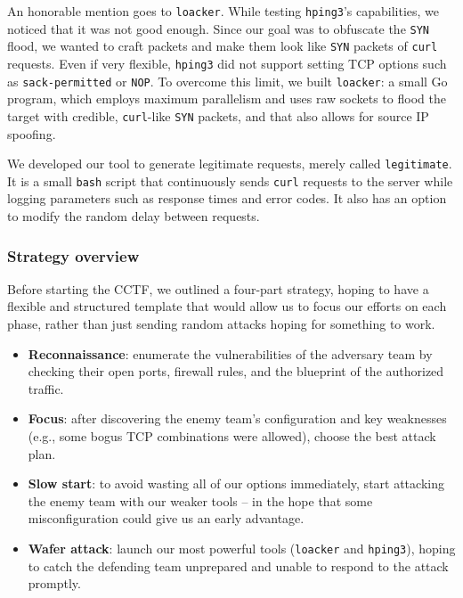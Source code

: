 An honorable mention goes to \texttt{loacker}. While testing \texttt{hping3}'s capabilities, we noticed that it was not good enough. Since our goal was to obfuscate the \texttt{SYN} flood, we wanted to craft packets and make them look like \texttt{SYN} packets of \texttt{curl} requests. Even if very flexible, \texttt{hping3} did not support setting TCP options such as \texttt{sack-permitted} or \texttt{NOP}. 
To overcome this limit, we built \texttt{loacker}: a small Go program, which employs maximum parallelism and uses raw sockets to flood the target with credible, \texttt{curl}-like \texttt{SYN} packets, and that also allows for source IP spoofing.

We developed our tool to generate legitimate requests, merely called \texttt{legitimate}. It is a small \texttt{bash} script that continuously sends \texttt{curl} requests to the server while logging parameters such as response times and error codes. It also has an option to modify the random delay between requests.

\subsubsection{Strategy overview}
\label{sec:cctf-resilient:att-prep:strat-out}

Before starting the CCTF, we outlined a four-part strategy, hoping to have a flexible and structured template that would allow us to focus our efforts on each phase, rather than just sending random attacks hoping for something to work.

\begin{itemize}
    \item \textbf{Reconnaissance}: enumerate the vulnerabilities of the adversary team by checking their open ports, firewall rules, and the blueprint of the authorized traffic.
    \item \textbf{Focus}: after discovering the enemy team's configuration and key weaknesses (e.g., some bogus TCP combinations were allowed), choose the best attack plan.
    \item \textbf{Slow start}: to avoid wasting all of our options immediately, start attacking the enemy team with our weaker tools -- in the hope that some misconfiguration could give us an early advantage.
    \item \textbf{Wafer attack}: launch our most powerful tools (\texttt{loacker} and \texttt{hping3}), hoping to catch the defending team unprepared and unable to respond to the attack promptly.
\end{itemize}

